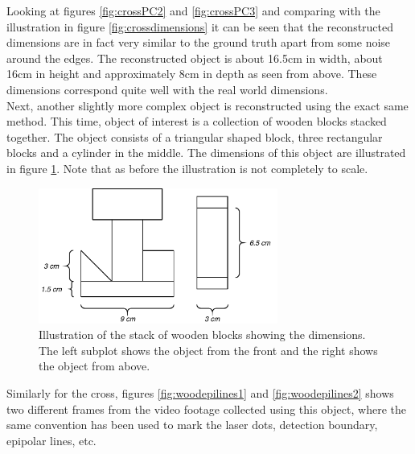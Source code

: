 Looking at figures \ref{fig:crossPC2} and \ref{fig:crossPC3} and comparing with the illustration in figure \ref{fig:crossdimensions} it can be seen that the reconstructed dimensions are in fact very similar to the ground truth apart from some noise around the edges. The reconstructed object is about 16.5cm in width, about 16cm in height and approximately 8cm in depth as seen from above. These dimensions correspond quite well with the real world dimensions.\\

Next, another slightly more complex object is reconstructed using the exact same method. This time, object of interest is a collection of wooden blocks stacked together. The object consists of a triangular shaped block, three rectangular blocks and a cylinder in the middle. The dimensions of this object are illustrated in figure \ref{fig:wooddimensions}. Note that as before the illustration is not completely to scale. 

\begin{figure}[H]
    \centering
    \includegraphics[width=0.7\textwidth]{figures/reconstruction/wooddimensions.pdf}
    \caption{Illustration of the stack of wooden blocks showing the dimensions. The left subplot shows the object from the front and the right shows the object from above.}
    \label{fig:wooddimensions}
\end{figure}

Similarly for the cross, figures \ref{fig:woodepilines1} and \ref{fig:woodepilines2} shows two different frames from the video footage collected using this object, where the same convention has been used to mark the laser dots, detection boundary, epipolar lines, etc.\\

